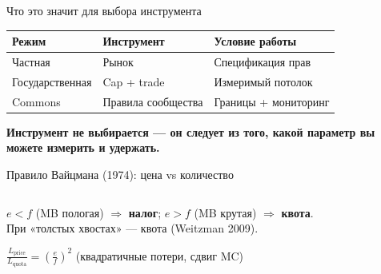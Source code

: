 \documentclass[10pt]{beamer}
\begin{document}
\begin{frame}{Что это значит для выбора инструмента}
  \centering
  \begin{tabular}{|>{\centering\arraybackslash}p{2.5cm}|>{\centering\arraybackslash}p{3cm}|>{\centering\arraybackslash}p{4cm}|} \hline
   \textbf{Режим} & \textbf{Инструмент} & \textbf{Условие работы} \\ \hline
    Частная & Рынок & Спецификация прав \\ \hline
    Государственная & Cap + trade & Измеримый потолок \\ \hline
    Commons & Правила сообщества & Границы + мониторинг \\ \hline
  \end{tabular}
  \vspace{0.8cm}
  \begin{block}{}
    \textbf{Инструмент не выбирается — он следует из того, какой параметр вы можете измерить и удержать.}
  \end{block}
\end{frame}

\begin{frame}{Правило Вайцмана (1974): цена vs количество}
  \begin{columns}
  \end{columns}
  \vspace{0.5cm}
  \begin{block}{}
    $e < f$ (MB пологая) $\Rightarrow$ \textbf{налог}; $e > f$ (MB крутая) $\Rightarrow$ \textbf{квота}. \\
    При «толстых хвостах» — квота (Weitzman 2009).
  \end{block}
  \footnotesize $\displaystyle \frac{L_{\text{price}}}{L_{\text{quota}}} = \left( \frac{e}{f} \right)^2$ (квадратичные потери, сдвиг MC)
\end{frame}
\end{document}
